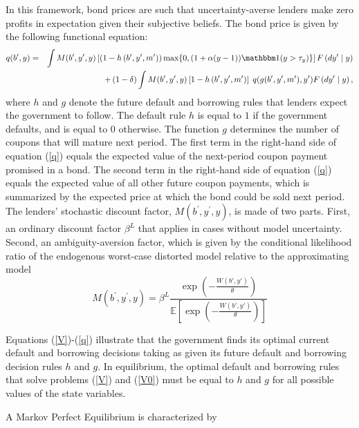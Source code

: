 In this framework, bond prices are such that uncertainty-averse lenders make zero profits in expectation given their subjective beliefs. The bond price is given by the following functional equation:
\begin{eqnarray}
q(b^{\prime },y) &=&\int M(b^\prime, y^{\prime },y)\left[ (1-h\left(b^{\prime}, y^{\prime}, m' \right))\max \{0,  (1+\alpha(y-1)) \ind (y > \tau_y) \} \right] F\left( dy^{\prime }\mid
y\right) \notag
\\
&&+\left(1-\delta\right) \int M(b^\prime, y^{\prime },y)\left[ 1-h\left(
b^{\prime}, y^{\prime}, m' \right) \right] \;q(g(b^{\prime },y^{\prime }, m'),y^{\prime })F\left( dy^{\prime }\mid
y\right), \label{q}
\end{eqnarray}%
where $h$ and $g$ denote the future default and borrowing rules that lenders expect the government to follow.  The default rule $h$ is equal to $1$ if the government defaults, and is equal to $0$ otherwise. The function $g$ determines the number of coupons that will mature next period. The first term in the right-hand side of equation (\ref{q}) equals the expected value of the next-period coupon payment promised in a bond. The second term in the right-hand side of equation (\ref{q}) equals the expected value of all other future coupon payments, which is summarized by the expected price at which the bond could be sold next period. The lenders' stochastic discount factor, $M(b^\prime, y^\prime,y)$, is made of two parts. First, an ordinary discount factor $\beta^L$ that applies in cases without model uncertainty. Second, an ambiguity-aversion factor, which is given by the conditional likelihood ratio of the endogenous worst-case distorted model relative to the approximating model
\begin{equation}
M(b^\prime, y^{\prime },y) = \beta^L \frac{\exp\left(-\frac{W(b',y')}{\theta}\right)}{\mathbb{E}\left[\exp\left(-\frac{W(b',y')}{\theta}\right)\right]}
\end{equation}

Equations (\ref{V})-(\ref{q}) illustrate that the government finds its optimal current default and borrowing decisions taking as given
its future default and borrowing decision rules $h$ and $g$. In equilibrium, the optimal default and borrowing rules that solve
problems (\ref{V}) and (\ref{V0}) must be equal to $h$ and $g$ for all possible values of the state variables.

\begin{definition}
A Markov Perfect Equilibrium is characterized by
\end{definition}

